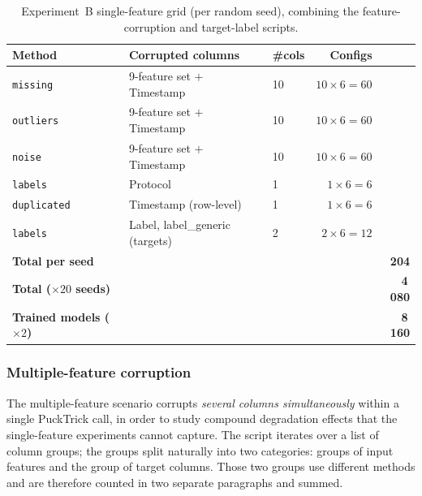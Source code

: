 \documentclass[../main.tex]{subfiles}
\begin{document}
\begin{table}[H]
\centering
\caption{Experiment~B single-feature grid (per random seed), combining the feature-corruption and target-label scripts.}
\label{tab:grid-B-single}
\small
\begin{tabular}{lllrr}
\toprule
\textbf{Method}    & \textbf{Corrupted columns}              & \textbf{\#cols} & \textbf{Configs} \\
\midrule
\texttt{missing}   & 9-feature set $+$ Timestamp             & 10              & $10 \times 6 = 60$ \\
\texttt{outliers}  & 9-feature set $+$ Timestamp             & 10              & $10 \times 6 = 60$ \\
\texttt{noise}     & 9-feature set $+$ Timestamp             & 10              & $10 \times 6 = 60$ \\
\texttt{labels}    & Protocol                                & 1               & $1 \times 6 = 6$  \\
\texttt{duplicated}& Timestamp (row-level)                   & 1               & $1 \times 6 = 6$  \\
\texttt{labels}    & Label, label\_generic (targets)         & 2               & $2 \times 6 = 12$ \\
\midrule
\textbf{Total per seed} & &                                       &                 & \textbf{204} \\
\textbf{Total ($\times 20$ seeds)} & &                          &                 & \textbf{4\,080} \\
\textbf{Trained models ($\times 2$)} & &                        &                 & \textbf{8\,160} \\
\bottomrule
\end{tabular}
\end{table}

\subsubsection{Multiple-feature corruption}
\label{sec:exp-B-multi}

The multiple-feature scenario corrupts \emph{several columns simultaneously} within a single PuckTrick call, in order to study compound degradation effects that the single-feature experiments cannot capture.  The script iterates over a list of column groups; the groups split naturally into two categories: groups of input features and the group of target columns. Those two groups use different methods and are therefore counted in two separate paragraphs and summed.
\end{document}
